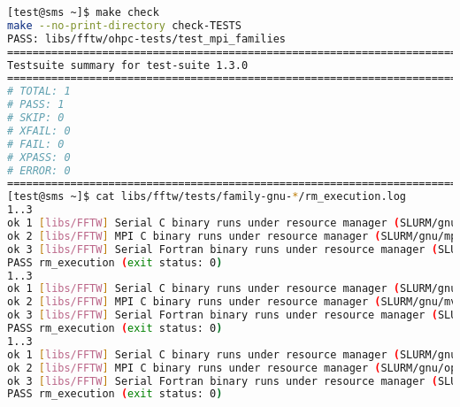 \begin{lstlisting}[language=bash,keywords={},upquote=true]
[test@sms ~]$ make check 
make --no-print-directory check-TESTS 
PASS: libs/fftw/ohpc-tests/test_mpi_families
============================================================================ 
Testsuite summary for test-suite 1.3.0
============================================================================ 
# TOTAL: 1 
# PASS: 1 
# SKIP: 0 
# XFAIL: 0 
# FAIL: 0 
# XPASS: 0 
# ERROR: 0 
============================================================================ 
[test@sms ~]$ cat libs/fftw/tests/family-gnu-*/rm_execution.log 
1..3 
ok 1 [libs/FFTW] Serial C binary runs under resource manager (SLURM/gnu/mpich) 
ok 2 [libs/FFTW] MPI C binary runs under resource manager (SLURM/gnu/mpich) 
ok 3 [libs/FFTW] Serial Fortran binary runs under resource manager (SLURM/gnu/mpich) 
PASS rm_execution (exit status: 0) 
1..3 
ok 1 [libs/FFTW] Serial C binary runs under resource manager (SLURM/gnu/mvapich2) 
ok 2 [libs/FFTW] MPI C binary runs under resource manager (SLURM/gnu/mvapich2) 
ok 3 [libs/FFTW] Serial Fortran binary runs under resource manager (SLURM/gnu/mvapich2) 
PASS rm_execution (exit status: 0) 
1..3 
ok 1 [libs/FFTW] Serial C binary runs under resource manager (SLURM/gnu/openmpi) 
ok 2 [libs/FFTW] MPI C binary runs under resource manager (SLURM/gnu/openmpi) 
ok 3 [libs/FFTW] Serial Fortran binary runs under resource manager (SLURM/gnu/openmpi) 
PASS rm_execution (exit status: 0)
\end{lstlisting}
